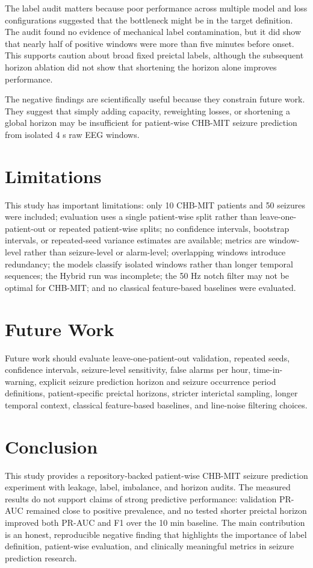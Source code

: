 \documentclass[10pt,conference]{IEEEtran}
\begin{document}
The label audit matters because poor performance across multiple model and loss configurations suggested that the bottleneck might be in the target definition. The audit found no evidence of mechanical label contamination, but it did show that nearly half of positive windows were more than five minutes before onset. This supports caution about broad fixed preictal labels, although the subsequent horizon ablation did not show that shortening the horizon alone improves performance.

The negative findings are scientifically useful because they constrain future work. They suggest that simply adding capacity, reweighting losses, or shortening a global horizon may be insufficient for patient-wise CHB-MIT seizure prediction from isolated 4 s raw EEG windows.

\section{Limitations}
This study has important limitations: only 10 CHB-MIT patients and 50 seizures were included; evaluation uses a single patient-wise split rather than leave-one-patient-out or repeated patient-wise splits; no confidence intervals, bootstrap intervals, or repeated-seed variance estimates are available; metrics are window-level rather than seizure-level or alarm-level; overlapping windows introduce redundancy; the models classify isolated windows rather than longer temporal sequences; the Hybrid run was incomplete; the 50 Hz notch filter may not be optimal for CHB-MIT; and no classical feature-based baselines were evaluated.

\section{Future Work}
Future work should evaluate leave-one-patient-out validation, repeated seeds, confidence intervals, seizure-level sensitivity, false alarms per hour, time-in-warning, explicit seizure prediction horizon and seizure occurrence period definitions, patient-specific preictal horizons, stricter interictal sampling, longer temporal context, classical feature-based baselines, and line-noise filtering choices.

\section{Conclusion}
This study provides a repository-backed patient-wise CHB-MIT seizure prediction experiment with leakage, label, imbalance, and horizon audits. The measured results do not support claims of strong predictive performance: validation PR-AUC remained close to positive prevalence, and no tested shorter preictal horizon improved both PR-AUC and F1 over the 10 min baseline. The main contribution is an honest, reproducible negative finding that highlights the importance of label definition, patient-wise evaluation, and clinically meaningful metrics in seizure prediction research.

\FloatBarrier


\end{document}
